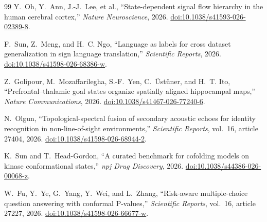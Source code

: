 \documentclass[11pt]{article}
\begin{document}
\begin{thebibliography}{99}
Y.~Oh, Y.~Ann, J.-J.~Lee, et al.,
``State-dependent signal flow hierarchy in the human cerebral cortex,''
\emph{Nature Neuroscience}, 2026.
\href{https://doi.org/10.1038/s41593-026-02389-8}
{doi:10.1038/s41593-026-02389-8}.

F.~Sun, Z.~Meng, and H.~C. Ngo,
``Language as labels for cross dataset generalization in sign language
translation,''
\emph{Scientific Reports}, 2026.
\href{https://doi.org/10.1038/s41598-026-68386-w}
{doi:10.1038/s41598-026-68386-w}.

Z.~Golipour, M.~Mozaffarilegha, S.-F.~Yen, C.~\"Ust\"uner, and
H.~T. Ito,
``Prefrontal--thalamic goal states organize spatially aligned
hippocampal maps,''
\emph{Nature Communications}, 2026.
\href{https://doi.org/10.1038/s41467-026-77240-6}
{doi:10.1038/s41467-026-77240-6}.

N.~Olgun,
``Topological-spectral fusion of secondary acoustic echoes for identity
recognition in non-line-of-sight environments,''
\emph{Scientific Reports}, vol.~16, article 27404, 2026.
\href{https://doi.org/10.1038/s41598-026-68944-2}
{doi:10.1038/s41598-026-68944-2}.

K.~Sun and T.~Head-Gordon,
``A curated benchmark for cofolding models on kinase conformational
states,''
\emph{npj Drug Discovery}, 2026.
\href{https://doi.org/10.1038/s44386-026-00068-z}
{doi:10.1038/s44386-026-00068-z}.

W.~Fu, Y.~Ye, G.~Yang, Y.~Wei, and L.~Zhang,
``Risk-aware multiple-choice question answering with conformal
P-values,''
\emph{Scientific Reports}, vol.~16, article 27227, 2026.
\href{https://doi.org/10.1038/s41598-026-66677-w}
{doi:10.1038/s41598-026-66677-w}.

\end{thebibliography}
\end{document}
